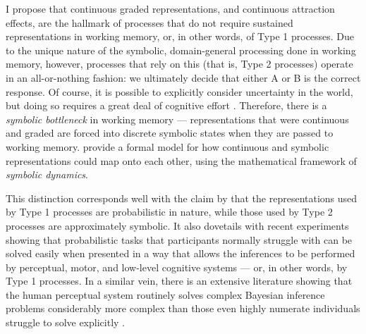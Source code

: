 I propose that continuous graded representations,
and continuous attraction effects,
are the hallmark of processes that do not require
sustained representations in working memory,
or, in other words, of Type 1 processes.
Due to the unique nature of the symbolic,
domain-general processing done in working memory, however,
processes that rely on this (that is, Type 2 processes)
operate in an all-or-nothing fashion:
we ultimately decide that either A or B is the correct response.
Of course, it is possible to explicitly consider uncertainty in the world,
but doing so requires a great deal of cognitive effort
\citep{Murphy2012,Malt1995,Tversky1982}.
Therefore, there is a \emph{symbolic bottleneck} in working memory ---
representations that were continuous and graded
are forced into discrete symbolic states
when they are passed to working memory.
\citet{Dale2005a} provide a formal model
for how continuous and symbolic representations could map onto each other,
using the mathematical framework of \emph{symbolic dynamics}.

This distinction corresponds well with
the claim by \citet{Oaksford2010,Oaksford2012} that
the representations used by Type 1 processes are probabilistic in nature,
while those used by Type 2 processes are approximately symbolic.
It also dovetails with recent experiments
showing that probabilistic tasks that participants normally struggle with
\citep[e.g.][]{Kahneman1979,Murphy2012}
can be solved easily when presented in a way
that allows the inferences to be performed
by perceptual, motor, and low-level cognitive systems
\citep{Chen2013,Glaser2012,Wu2009,Trommershauser2008a,
  Trommershauser2008,Trommershauser2006,Kording2004}
--- or, in other words, by Type 1 processes.
In a similar vein, there is an extensive literature showing
that the human perceptual system routinely solves complex Bayesian inference problems
\citep{Wolpert2005,Kersten2004,Roach2006}
considerably more complex than those
even highly numerate individuals struggle to solve explicitly
\citep[e.g.][]{McNair2013,Barbey2007}.

